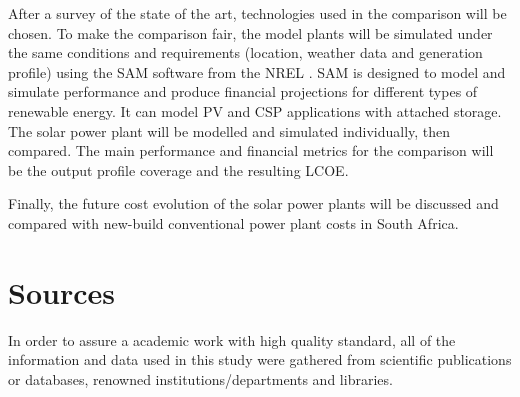 
After a survey of the state of the art, technologies used in the comparison will be chosen. To make the comparison fair, the model plants will be simulated under the same conditions and requirements (location, weather data and generation profile) using the \ac{SAM} software from the \ac{NREL} \cite{NREL2015}. \ac{SAM} is designed to model and simulate performance and produce financial projections for different types of renewable energy. It can model \ac{PV} and \ac{CSP} applications with attached storage. The solar power plant will be modelled and simulated individually, then compared. The main performance and financial metrics for the comparison will be the output profile coverage and the resulting \ac{LCOE}.


Finally, the future cost evolution of the solar power plants will be discussed and compared with new-build conventional power plant costs in South Africa.

\section{Sources}
In order to assure a academic work with high quality standard, all of the information and data used in this study were gathered from scientific publications or databases, renowned institutions/departments and libraries.

